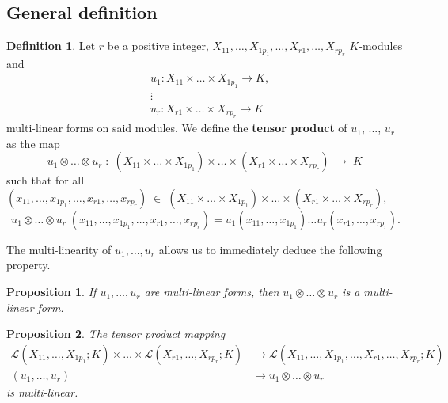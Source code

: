 \documentclass{report}
\newtheorem{prop}{Proposition}
\theoremstyle{definition}
\newtheorem{defin}{Definition}
\theoremstyle{remark}
\begin{document}
\subsection{General definition}
\begin{defin}
Let $r$ be a positive integer,  $X_{11}, \dots , X_{1p_1}, \dots, X_{r1} , \dots , X_{rp_r}$ $K$-modules and 
   \begin{equation*}
       \begin{split}
          & u_1 : X_{11} \times \dots \times X_{1p_1} \to K, \\
          & \vdots \\
          & u_r : X_{r1} \times \dots \times X_{rp_r} \to K
       \end{split}
   \end{equation*}
    multi-linear forms on said modules. 
We define the \textbf{tensor product} of $u_1$, ..., $u_r$ as the map 
$$u_1 \otimes \dots \otimes u_r\;:\;(X_{11}\times \dots \times X_{1p_1} )\times \dots \times (X_{r1} \times \dots \times X_{rp_r}) \;\longrightarrow\; K\,$$  such that for all $(x_{11},\dots,x_{1p_1},\dots,x_{r1},\dots,x_{rp_r}) \;\in \;(X_{11}\times \dots \times X_{1p_1} )\times \dots \times (X_{r1} \times \dots \times X_{rp_r})$,
\begin{equation*}
        u_1 \otimes \dots \otimes u_r \;(x_{11},\dots,x_{1p_1},\dots,x_{r1},\dots,x_{rp_r}) = u_1(x_{11},\dots,x_{1p_1})\dots u_r(x_{r1},\dots,x_{rp_r}).
\end{equation*}
\end{defin}

\bigskip
The multi-linearity of $ u_1,\dots,u_r $ allows us to immediately deduce the following property. 
 
 \bigskip
 \begin{prop}
     If $u_1,\dots,u_r$ are multi-linear forms, then $u_1 \otimes \dots \otimes u_r$ is a multi-linear form. 
 \end{prop}

\bigskip
\begin{prop}
        The tensor product mapping
        \begin{equation*}
                \begin{split}
                          \mathcal{L}(X_{11},\dots,X_{1p_1};K) \times \dots \times \mathcal{L}(X_{r1},\dots,X_{rp_r};K) & \to \mathcal{L}(X_{11},\dots,X_{1p_1},\dots,X_{r1},\dots,X_{rp_r};K) \\
                         (u_1,\dots,u_r) & \mapsto u_1 \otimes \dots \otimes u_r
                \end{split}
        \end{equation*}
        is multi-linear.
\end{prop}
\end{document}

